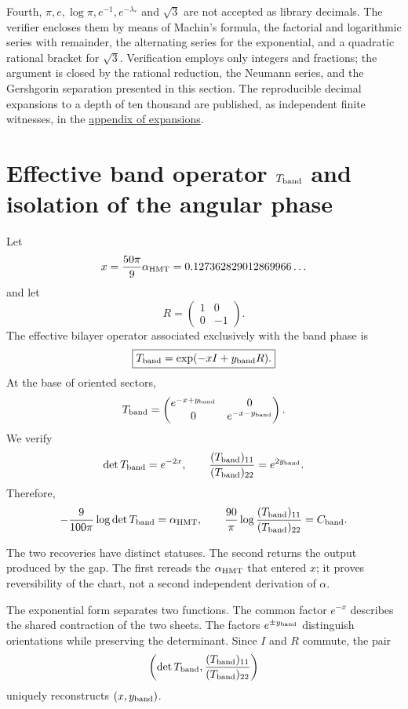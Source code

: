 Fourth, \(\pi,e,\log\pi,e^{-1},e^{-\lambda_*}\) and \(\sqrt3\) are not accepted as library decimals. The verifier encloses them by means of Machin's formula, the factorial and logarithmic series with remainder, the alternating series for the exponential, and a quadratic rational bracket for \(\sqrt3\). Verification employs only integers and fractions; the argument is closed by the rational reduction, the Neumann series, and the Gershgorin separation presented in this section. The reproducible decimal expansions to a depth of ten thousand are published, as independent finite witnesses, in the
\hyperref[app:desarrollos-10000-rev9]{appendix of expansions}.

\section{Effective band operator \texorpdfstring{\(T_{\rm band}\)}{Tband} and isolation of the angular phase}

Let
\[
 x=\frac{50\pi}{9}\alpha_{\rm HMT}
 =0.127362829012869966\ldots
\]
and let
\[
 R=\begin{pmatrix}1&0\\0&-1\end{pmatrix}.
\]
The effective bilayer operator associated exclusively with the band phase is
\[
 \boxed{T_{\rm band}=\exp(-xI+y_{\rm band}R).}
\]
At the base of oriented sectors,
\[
 T_{\rm band}
 =\begin{pmatrix}
 e^{-x+y_{\rm band}}&0\\
 0&e^{-x-y_{\rm band}}
 \end{pmatrix}.
\]
We verify
\[
 \det T_{\rm band}=e^{-2x},
 \qquad
 \frac{(T_{\rm band})_{11}}{(T_{\rm band})_{22}}
 =e^{2y_{\rm band}}.
\]
Therefore,
\[
 -\frac9{100\pi}\log\det T_{\rm band}=\alpha_{\rm HMT},
 \qquad
 \frac{90}{\pi}
 \log\frac{(T_{\rm band})_{11}}{(T_{\rm band})_{22}}
 =C_{\rm band}.
\]

The two recoveries have distinct statuses. The second returns the output
produced by the gap. The first rereads the \(\alpha_{\rm HMT}\) that entered
\(x\); it proves reversibility of the chart, not a second independent
derivation of \(\alpha\).

The exponential form separates two functions. The common factor \(e^{-x}\)
describes the shared contraction of the two sheets. The factors
\(e^{\pm y_{\rm band}}\) distinguish orientations while preserving the determinant. Since
\(I\) and \(R\) commute, the pair
\[
 \left(\det T_{\rm band},
 \frac{(T_{\rm band})_{11}}{(T_{\rm band})_{22}}\right)
\]
uniquely reconstructs \((x,y_{\rm band})\).

